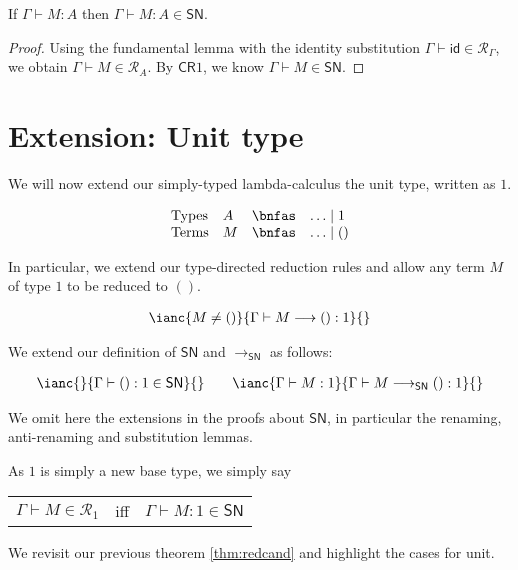 \documentclass{article}
\newcommand{\one}{1}
\newcommand{\SN}{\mathsf{SN}}
\newcommand{\CR}{\textsf{CR}}
\newcommand{\denot}[1]{\mathcal{R}_{#1}}
\newcommand{\inden}[3]{#1 \vdash #2 \in \denot{#3}}
\newcommand{\red}{\longrightarrow}
\newcommand{\redSN}{\longrightarrow_\SN}
\begin{document}
\begin{corollary}
If $\Gamma \vdash M : A$ then $\Gamma \vdash M : A \in \SN$.
\end{corollary}

\begin{proof}
Using the fundamental lemma with the identity substitution $\inden{\Gamma}{\textsf{id}}{\Gamma}$, we obtain  $\inden{\Gamma}{M}{A}$. By $\CR 1$, we know $\Gamma \vdash M \in \SN$.
\end{proof}


\newpage

\section{Extension: Unit type}
\label{sec:unit}
We will now extend our simply-typed lambda-calculus the unit type, written as $\one$.

\[
\begin{array}{llcl}
\mbox{Types}  & A & \bnfas & \ldots \mid \one\\
\mbox{Terms}  & M & \bnfas & \ldots \mid ()
\end{array}
\]

In particular, we extend our type-directed reduction rules and allow any term $M$ of type $\one$ to be reduced to $()$.

\[
  \begin{array}{c}
\ianc{M \not= ()}{\Gamma \vdash M \red () : \one}    {}
  \end{array}
\]

We extend our definition of $\SN$ and $\redSN$ as follows:

\[
  \begin{array}{c}
\ianc{}{\Gamma \vdash () : \one \in \SN}    {} \qquad
\ianc{\Gamma \vdash M : \one}{\Gamma \vdash M \redSN () : \one}{}
  \end{array}
\]

We omit here the extensions in the proofs about $\SN$, in particular the renaming, anti-renaming and substitution lemmas.

As $\one$ is simply a new base type, we simply say

\begin{center}
\begin{tabular}{lcl}
$\inden{\Gamma}{M}{\one}$ & iff & $\Gamma \vdash M : \one \in \SN$
\end{tabular}
\end{center}

We revisit our previous theorem \ref{thm:redcand} and highlight the cases for unit.
\end{document}
